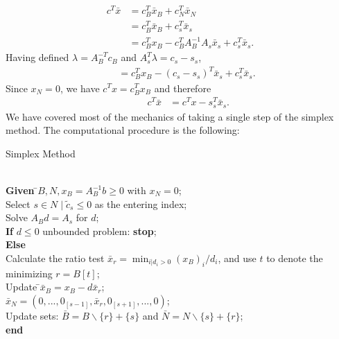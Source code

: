 \documentclass[a4paper,10 pt,titlepage,twoside]{report}
\theoremstyle{plain}
\theoremstyle{definition}
\theoremstyle{remark}
\begin{document}
\begin{align*}
c^{T}\bar{x} &=c^{T}_{B}\bar{x}_{B}+c^{T}_{N}\bar{x}_{N}\\
			 &=c_{B}^{T}\bar{x}_{B}+c^{T}_{s}\bar{x}_{s}\\
			 &=c_{B}^{T}x_{B}-c^{T}_{B}A_{B}^{-1}A_{s}\bar{x}_{s}+c_{s}^{T}\bar{x}_{s}.
\end{align*}
Having defined $ \lambda=A_{B}^{-T}c_{B}$ and $A^{T}_{s}\lambda = c_{s}-s_{s}$,
\begin{align*}
\;\;&= c^{T}_{B}x_{B}-(c_{s} -s_{s})^{T}\bar{x}_{s} +c_{s}^{T}\bar{x}_{s}.
\end{align*}
Since $x_{N}=0$, we have $c^{T}x=c^{T}_{B}x_{B}$ and therefore 
\begin{align*}
\;\;\;\;\;\;c^{T}\bar{x}& = c^{T}x - s_{s}^{T}\bar{x}_{s}.
\end{align*}
We have covered most of the mechanics of taking a single step of the simplex method. The computational procedure is the following:
\\
\begin{algorithm}[H]\caption{\label{Alg:1}Simplex Method}
\begin{tabbing}
	\\
	\textbf{Given} \=$B, N, x_{B} = A_{B}^{-1}b\geq 0$ with $x_{N}=0$;\\
	\> Select $s\in N\;|\;\widetilde{c}_{s}\leq 0$ as the entering index;\\
	\> Solve $A_{B}d = A_{s}$ for $d$;\\
	\>\textbf{If} {$d \leq 0$} unbounded problem: \textbf{stop};\\
	\>\textbf{Else} \=\\
	\>\>Calculate the ratio test $\bar{x}_{r} = \min_{i | d_{i} > 0}(x_{B})_{i}/d_{i}$, and use $t$ to denote the minimizing $r = B[t]$;\\
	\>\>Update \=$\bar{x}_{B} = x_{B}-d\bar{x}_{r}$;\\
	\>\>\>$\bar{x}_{N} = (0,...,0_{[s-1]},\bar{x}_{r},0_{[s+1]},...,0)$;\\
	\>\> Update sets: $\bar{B} = B \backslash \{r\} + \{s\}$ and $\bar{N} = N \backslash \{s\} + \{r\}$;\\
	\textbf{end}
\end{tabbing}
\end{algorithm}
\end{document}
